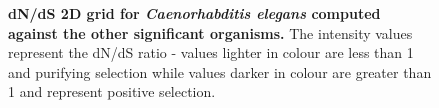 \documentclass{article}
\begin{document}
\begin{figure}[H]
\centering
{}
\caption{\textbf{dN/dS 2D grid for \textit{Caenorhabditis elegans} computed against the other significant organisms.} The intensity values represent the dN/dS ratio - values lighter in colour are less than 1 and purifying selection while values darker in colour are greater than 1 and represent positive selection.}
\label{sup_fig_21}
\end{figure}
\end{document}
